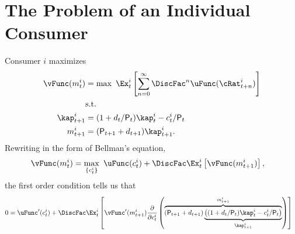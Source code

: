 \documentclass{\handout}
\begin{document}
\section{The Problem of an Individual Consumer}
Consumer $i$ maximizes 
\begin{equation}\begin{gathered}\begin{aligned}
        \vFunc({m}_{t}^{i}) & =  \max ~ \Ex_{t}^{i}\left[\sum_{n=0}^{\infty} \DiscFac^{n} \uFunc(\cRat_{t+n}^{i}) \right]  \label{eq:origprob}
\\      & \text{s.t.}    \nonumber
\\  \kap_{t+1}^{i} & =  (1+\dvdnd_{t}/\Price_{t})\kap_{t}^{i}-c_{t}^{i}/\Price_{t} \notag
\\  {m}_{t+1}^{i} & =  (\Price_{t+1}+\dvdnd_{t+1})\kap_{t+1}^{i}. \notag
\end{aligned}\end{gathered}\end{equation}
Rewriting in the form of Bellman's equation,\hypertarget{Bellman}{}
\begin{equation*}\begin{gathered}\begin{aligned}
        \vFunc({m}_{t}^{i}) & =  \max_{\{c_{t}^{i}\}} ~ \uFunc(c_{t}^{i}) + \DiscFac \Ex_{t}^{i}\left[\vFunc({m}_{t+1}^{i})\right]
,
\end{aligned}\end{gathered}\end{equation*}
the first order condition tells us that 
\begin{equation}\begin{gathered}\begin{aligned}
        0 & =  \uFunc^{\prime}(c_{t}^{i})+\DiscFac \Ex_{t}^{i}\left[\vFunc^{\prime}({m}_{t+1}^{i})\frac{\partial}{\partial c_{t}^{i}}\left(\overbrace{({\Price}_{t+1}+\dvdnd_{t+1})\underbrace{\left((1+\dvdnd_{t}/\Price_{t})\kap_{t}^{i}-c_{t}^{i}/\Price_{t}\right)}_{\kap_{t+1}^{i}}}^{{m}_{t+1}^{i}}\right)\right] 
\end{aligned}\end{gathered}\end{equation} 
\end{document}
